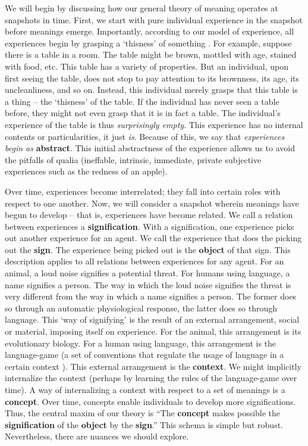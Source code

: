 We will begin by discussing how our general theory of meaning operates at snapshots in time.
First, we start with pure individual experience in the snapshot before meanings emerge.
Importantly, according to our model of experience, all experiences begin by grasping a `thisness' of something \citep{Hegel:PhG}.
For example, suppose there is a table in a room.
The table might be brown, mottled with age, stained with food, etc.
This table has a variety of properties.
But an individual, upon first seeing the table, does not stop to pay attention to its brownness, its age, its uncleanliness, and so on.
Instead, this individual merely grasps that this table is a thing -- the `thisness' of the table.
If the individual has never seen a table before, they might not even grasp that it is in fact a table.
The individual's experience of the table is thus \textit{surprisingly empty}.
This experience has no internal contents or particularities, it just \textit{is}.
Because of this, we say that \textit{experiences begin as }\textbf{abstract}.
This initial abstractness of the experience allows us to avoid the pitfalls of qualia (ineffable, intrinsic, immediate, private \citep{Dennett:QuiningQualia} subjective experiences such as the redness of an apple).

Over time, experiences become interrelated; they fall into certain roles with respect to one another.
Now, we will consider a snapshot wherein meanings have begun to develop -- that is, experiences have become related.
We call a relation between experiences a \textbf{signification}.
With a signification, one experience picks out another experience for an agent.
We call the experience that does the picking out the \textbf{sign}.
The experience being picked out is the \textbf{object} of that sign.
This description applies to all relations between experiences for any agent.
For an animal, a loud noise signifies a potential threat.
For humans using language, a name signifies a person.
The way in which the loud noise signifies the threat is very different from the way in which a name signifies a person.
The former does so through an automatic physiological response, the latter does so through language.
This `way of signifying' is the result of an external arrangement, social or material, imposing itself on experience.
For the animal, this arrangement is its evolutionary biology.
For a human using language, this arrangement is the language-game (a set of conventions that regulate the usage of language in a certain context \citep{Wittgenstein:PhilosophicalInvestigations}). 
This external arrangement is the \textbf{context}.
We might implicitly internalize the context (perhaps by learning the rules of the language-game over time).
A way of internalizing a context with respect to a set of meanings is a \textbf{concept}.
Over time, concepts enable individuals to develop more significations.
Thus, the central maxim of our theory is ``The \textbf{concept} makes possible the \textbf{signification} of the \textbf{object} by the \textbf{sign}.''
This schema is simple but robust.
Nevertheless, there are nuances we should explore.

